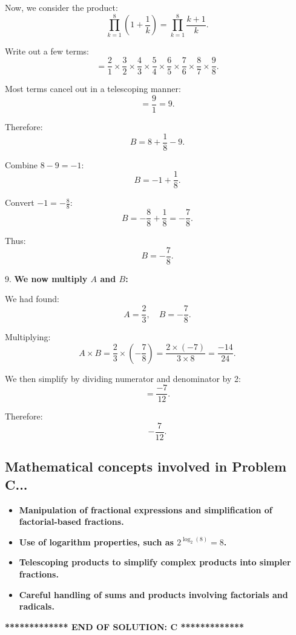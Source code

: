 \documentclass[12pt,a4paper]{article}
\begin{document}
   \bigskip

   Now, we consider the product:
   \[
   \prod_{k=1}^{8}\left(1+\frac{1}{k}\right) = \prod_{k=1}^{8}\frac{k+1}{k}.
   \]

   Write out a few terms:
   \[
   = \frac{2}{1}\times\frac{3}{2}\times\frac{4}{3}\times\frac{5}{4}\times\frac{6}{5}\times\frac{7}{6}\times\frac{8}{7}\times\frac{9}{8}.
   \]

   Most terms cancel out in a telescoping manner:
   \[
   = \frac{9}{1} = 9.
   \]

   Therefore:
   \[
   B = 8 + \frac{1}{8} - 9.
   \]

   Combine \(8-9=-1\):
   \[
   B = -1 + \frac{1}{8}.
   \]

   Convert \(-1 = -\frac{8}{8}\):
   \[
   B = -\frac{8}{8} + \frac{1}{8} = -\frac{7}{8}.
   \]

   Thus:
   \[
   B = -\frac{7}{8}.
   \]

   \bigskip

9. \textbf{We now multiply \(A\) and \(B\):}

   We had found:
   \[
   A = \frac{2}{3}, \quad B = -\frac{7}{8}.
   \]

   Multiplying:
   \[
   A \times B = \frac{2}{3}\times\left(-\frac{7}{8}\right) = \frac{2\times(-7)}{3\times8} = \frac{-14}{24}.
   \]

   We then simplify by dividing numerator and denominator by 2:
   \[
   = \frac{-7}{12}.
   \]

   Therefore:
   \[
   \boxed{-\frac{7}{12}}.
   \]


   \bigskip

   \subsection*{Mathematical concepts involved in Problem C...}
   \begin{itemize}
      \item \textbf{Manipulation of fractional expressions and simplification of factorial-based fractions.}
      \item \textbf{Use of logarithm properties, such as \(2^{\log_2(8)} = 8\).}
      \item \textbf{Telescoping products to simplify complex products into simpler fractions.}
      \item \textbf{Careful handling of sums and products involving factorials and radicals.}
   \end{itemize}
   
   \bigskip
   \noindent\hrulefill
   \begin{center}
   \textbf{************* END OF SOLUTION: C *************}
   \end{center}
   \hrulefill
   
   
\end{document}
